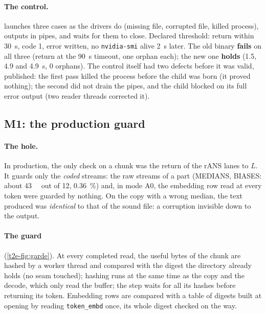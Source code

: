 \paragraph{The control.}  launches three cases as the drivers do (missing file, corrupted file, killed process), outputs in pipes, and waits for them to close. Declared threshold: return within \SI{30}{\second}, code 1, error written, no \texttt{nvidia-smi} alive \SI{2}{\second} later. The old binary \textbf{fails} on all three (return at the \SI{90}{\second} timeout, one orphan each); the new one \textbf{holds} (\num{1.5}, \num{4.9} and \SI{4.9}{\second}, 0 orphans). The control itself had two defects before it was valid, published: the first pass killed the process before the child was born (it proved nothing); the second did not drain the pipes, and the child blocked on its full error output (two reader threads corrected it).

\subsection{M1: the production guard}\label{t2e-sec:garde}

\paragraph{The hole.} In production, the only check on a chunk was the return of the rANS lanes to $L$. It guards only the \emph{coded} streams: the raw streams of a part (MEDIANS, BIASES: about \SI{43}{\kilo\octet} out of \SI{12}{\Mo}, \SI{0.36}{\percent}) and, in mode A0, the embedding row read at every token were guarded by nothing. On the copy with a wrong median, the text produced was \emph{identical} to that of the sound file: a corruption invisible down to the output.

\paragraph{The guard} (\cref{t2e-fig:garde}). At every completed read, the useful bytes of the chunk are hashed by a worker thread and compared with the digest the directory already holds (no seam touched); hashing runs at the same time as the copy and the decode, which only read the buffer; the step waits for all its hashes before returning its token. Embedding rows are compared with a table of digests built at opening by reading \texttt{token\_embd} once, its whole digest checked on the way.

